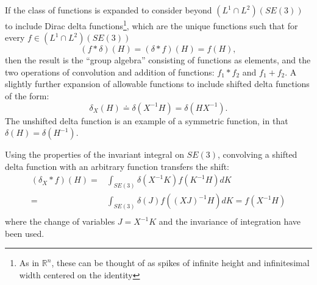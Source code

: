 \documentclass[twocolumn,10pt]{asme2ej}
\begin{document}
If the class of functions is expanded to consider beyond $(L^1 \cap L^2)(SE(3))$
to include Dirac delta functions\footnote{As in $\mathbb{R}^n$, these can be thought of as spikes
of infinite height and infinitesimal width centered on the identity}, which are the unique functions such that for every $f \in (L^1 \cap L^2)(SE(3))$
$$ (f * \delta)(H) = (\delta * f)(H) = f(H), $$
then the result is the ``group algebra'' consisting of functions as elements, and the two operations of convolution and addition of
functions: $f_1*f_2$ and $f_1 + f_2$. A slightly further expansion of allowable functions to include shifted delta functions of the form:
$$ \delta_X(H) \doteq \delta(X^{-1} H) = \delta( H X^{-1}). $$
The unshifted delta function is an example of a symmetric function, in that $\delta(H) = \delta(H^{-1})$.

Using the properties of the invariant integral on $SE(3)$, convolving a shifted delta function with an arbitrary
function transfers the shift:
\begin{equation}
\begin{split}
(\delta_X * f)(H) =& \int_{SE(3)} \delta(X^{-1} K) f(K^{-1} H) dK \\
=& \int_{SE(3)} \delta(J) f((XJ)^{-1} H) dK = f(X^{-1} H) \\
\end{split}
\end{equation}
where the change of variables $J = X^{-1} K$ and the invariance of integration have been used.

\end{document}
